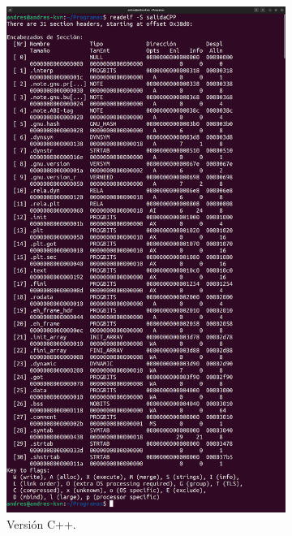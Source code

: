 \documentclass{article}
\begin{document}
\begin{figure}[H]
    \centering
    \begin{subfigure}{0.49\textwidth}
        \centering
        \includegraphics[width=\textwidth]{imagenes/CPP/merged.png}
        \caption{Versión C++.}
    \end{subfigure}
    \hfill
    \begin{subfigure}{0.49\textwidth}
        \centering

\end{subfigure}
\end{figure}
\end{document}
